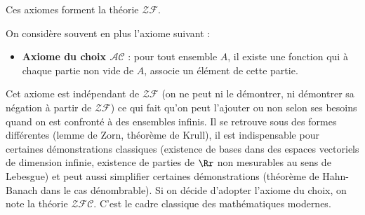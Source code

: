 \documentclass[11pt,class=report,crop=false]{standalone}
\begin{document}
Ces axiomes forment la théorie $\mathcal{ZF}$.

\bigskip

On considère souvent en plus l'axiome suivant :

\begin{itemize}
	\item \textbf{Axiome du choix $\mathcal{AC}$} : pour tout ensemble $A$, il existe une fonction qui à chaque partie non vide de $A$, associe un élément de cette partie.
\end{itemize}

Cet axiome est indépendant de $\mathcal{ZF}$ (on ne peut ni le démontrer, ni démontrer sa négation à partir de $\mathcal{ZF}$) ce qui fait qu'on peut l'ajouter ou non selon ses besoins quand on est confronté à des ensembles infinis.
Il se retrouve sous des formes différentes (lemme de Zorn, théorème de Krull), il est indispensable pour certaines démonstrations classiques (existence de bases dans des espaces vectoriels de dimension infinie, existence de parties de $\Rr$ non mesurables au sens de Lebesgue) et peut aussi simplifier certaines démonstrations (théorème de Hahn-Banach dans le cas dénombrable).
Si on décide d'adopter l'axiome du choix, on note la théorie $\mathcal{ZFC}$.
C'est le cadre classique des mathématiques modernes.

\end{document}
